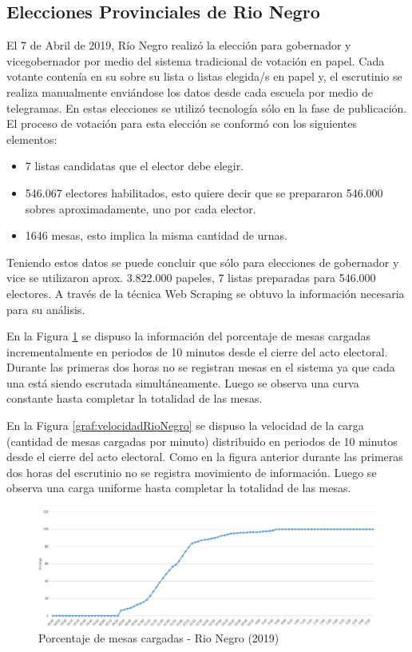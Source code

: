 \subsection{Elecciones Provinciales de Rio Negro}

El 7 de Abril de 2019, Río Negro realizó la elección para gobernador y vicegobernador por medio del sistema tradicional de votación en papel. Cada votante contenía en su sobre su lista o listas elegida/s en papel y, el escrutinio se realiza manualmente enviándose los datos desde cada escuela por medio de telegramas. En estas elecciones se utilizó tecnología sólo en la fase de publicación. El proceso de votación para esta elección se conformó con los siguientes elementos:
\begin{itemize}
    \item 7 listas candidatas que el elector debe elegir.
    \item 546.067 electores habilitados, esto quiere decir que se prepararon 546.000 sobres aproximadamente, uno por cada elector.
    \item 1646 mesas, esto implica la misma cantidad de urnas.
\end{itemize}
Teniendo estos datos se puede concluir que sólo para elecciones de gobernador y vice se utilizaron aprox. 3.822.000 papeles, 7 listas preparadas para 546.000 electores. A través de la técnica Web Scraping se obtuvo la información necesaria para su análisis.

En la Figura \ref{graf:porcentajeRioNegro} se dispuso la información del porcentaje de mesas cargadas incrementalmente en periodos de 10 minutos desde el cierre del acto electoral. Durante las primeras dos horas no se registran mesas en el sistema ya que cada una está siendo escrutada simultáneamente. Luego se observa una curva constante hasta completar la totalidad de las mesas.

En la Figura \ref{graf:velocidadRioNegro} se dispuso la velocidad de la carga (cantidad de mesas cargadas por minuto) distribuido en periodos de 10 minutos desde el cierre del acto electoral. Como en la figura anterior durante las primeras dos horas del escrutinio no se registra movimiento de información. Luego se observa una carga uniforme hasta completar la totalidad de las mesas. 

\begin{figure}[h!]
  \includegraphics[width=1\textwidth]{img/sAveHlGEkX.png}
  \caption{Porcentaje de mesas cargadas - Rio Negro (2019)}
  \label{graf:porcentajeRioNegro}
\end{figure}

